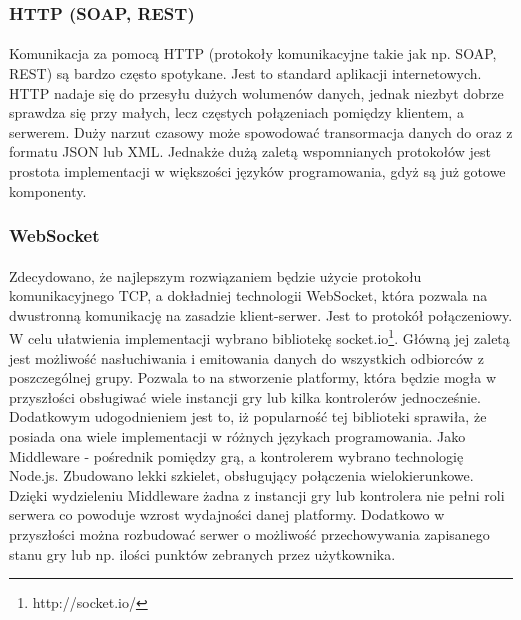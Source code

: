 \subsubsection{HTTP (SOAP, REST)}
\paragraph{}
Komunikacja za pomocą HTTP (protokoły komunikacyjne takie jak np. SOAP, REST) są bardzo często spotykane. Jest to standard aplikacji internetowych. HTTP nadaje się do przesyłu dużych wolumenów danych, jednak niezbyt dobrze sprawdza się przy małych, lecz częstych połązeniach pomiędzy klientem, a serwerem. Duży narzut czasowy może spowodować transormacja danych do oraz z formatu JSON lub XML. Jednakże dużą zaletą wspomnianych protokołów jest prostota implementacji w większości języków programowania, gdyż są już gotowe komponenty.
\subsubsection{WebSocket}
\paragraph{}
Zdecydowano, że najlepszym rozwiązaniem będzie użycie protokołu komunikacyjnego TCP, a dokładniej technologii WebSocket, która pozwala na dwustronną komunikację na zasadzie klient-serwer. Jest to protokół połączeniowy.
W celu ułatwienia implementacji wybrano bibliotekę socket.io\footnote{http://socket.io/}. Główną jej zaletą jest możliwość nasłuchiwania i emitowania danych do wszystkich odbiorców z poszczególnej grupy. Pozwala to na stworzenie platformy, która będzie mogła w przyszłości obsługiwać wiele instancji gry lub kilka kontrolerów jednocześnie. Dodatkowym udogodnieniem jest to, iż popularność tej biblioteki sprawiła, że posiada ona wiele implementacji w różnych językach programowania.
Jako Middleware - pośrednik pomiędzy grą, a kontrolerem wybrano technologię Node.js. Zbudowano lekki szkielet, obsługujący połączenia wielokierunkowe. Dzięki wydzieleniu Middleware żadna z instancji gry lub kontrolera nie pełni roli serwera co powoduje wzrost wydajności danej platformy. Dodatkowo w przyszłości można rozbudować serwer o możliwość przechowywania zapisanego stanu gry lub np. ilości punktów zebranych przez użytkownika.